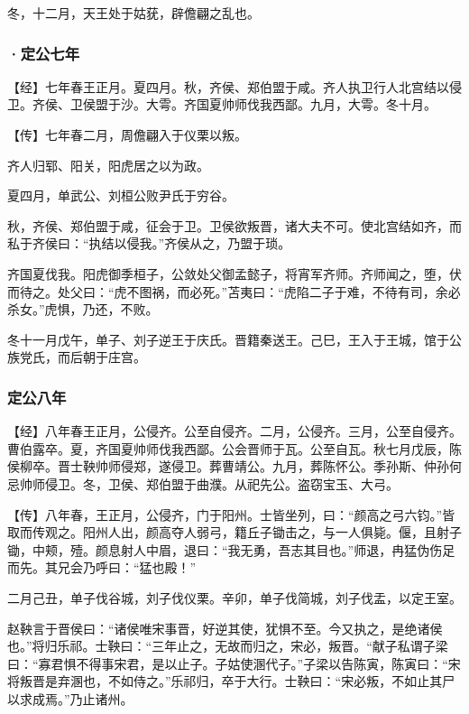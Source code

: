 \documentclass[]{article}
\begin{document}
冬，十二月，天王处于姑莸，辟儋翩之乱也。

\hypertarget{header-n2945}{%
\subsubsection{·定公七年}\label{header-n2945}}

【经】七年春王正月。夏四月。秋，齐侯、郑伯盟于咸。齐人执卫行人北宫结以侵卫。齐侯、卫侯盟于沙。大雩。齐国夏帅师伐我西鄙。九月，大雩。冬十月。

【传】七年春二月，周儋翩入于仪栗以叛。

齐人归郓、阳关，阳虎居之以为政。

夏四月，单武公、刘桓公败尹氏于穷谷。

秋，齐侯、郑伯盟于咸，征会于卫。卫侯欲叛晋，诸大夫不可。使北宫结如齐，而私于齐侯曰：``执结以侵我。''齐侯从之，乃盟于琐。

齐国夏伐我。阳虎御季桓子，公敛处父御孟懿子，将宵军齐师。齐师闻之，堕，伏而待之。处父曰：``虎不图祸，而必死。''苫夷曰：``虎陷二子于难，不待有司，余必杀女。''虎惧，乃还，不败。

冬十一月戊午，单子、刘子逆王于庆氏。晋籍秦送王。己巳，王入于王城，馆于公族党氏，而后朝于庄宫。

\hypertarget{header-n2955}{%
\subsubsection{定公八年}\label{header-n2955}}

【经】八年春王正月，公侵齐。公至自侵齐。二月，公侵齐。三月，公至自侵齐。曹伯露卒。夏，齐国夏帅师伐我西鄙。公会晋师于瓦。公至自瓦。秋七月戊辰，陈侯柳卒。晋士鞅帅师侵郑，遂侵卫。葬曹靖公。九月，葬陈怀公。季孙斯、仲孙何忌帅师侵卫。冬，卫侯、郑伯盟于曲濮。从祀先公。盗窃宝玉、大弓。

【传】八年春，王正月，公侵齐，门于阳州。士皆坐列，曰：``颜高之弓六钧。''皆取而传观之。阳州人出，颜高夺人弱弓，籍丘子锄击之，与一人俱毙。偃，且射子锄，中颊，殪。颜息射人中眉，退曰：``我无勇，吾志其目也。''师退，冉猛伪伤足而先。其兄会乃呼曰：``猛也殿！''

二月己丑，单子伐谷城，刘子伐仪栗。辛卯，单子伐简城，刘子伐盂，以定王室。

赵鞅言于晋侯曰：``诸侯唯宋事晋，好逆其使，犹惧不至。今又执之，是绝诸侯也。''将归乐祁。士鞅曰：``三年止之，无故而归之，宋必，叛晋。``献子私谓子梁曰：``寡君惧不得事宋君，是以止子。子姑使溷代子。''子梁以告陈寅，陈寅曰：``宋将叛晋是弃溷也，不如侍之。''乐祁归，卒于大行。士鞅曰：``宋必叛，不如止其尸以求成焉。''乃止诸州。
\end{document}
